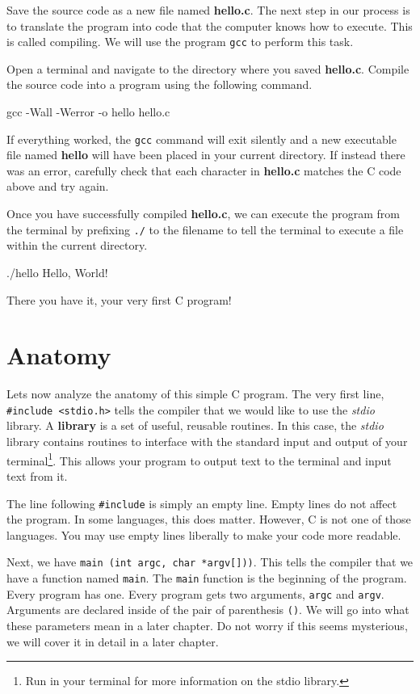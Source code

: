 \documentclass[12pt]{article}
\newcommand{\file}[1]{{\bf\ttfamily #1}}
\newcommand{\ident}[1]{{\it\ttfamily #1}}
\begin{document}
Save the source code as a new file named \file{hello.c}. The next step in our
process is to translate the program into code that the computer knows how to
execute. This is called compiling. We will use the program \verb|gcc| to
perform this task.

Open a terminal and navigate to the directory where you saved \file{hello.c}.
Compile the source code into a program using the following command.

\begin{Terminal}
gcc -Wall -Werror -o hello hello.c
\end{Terminal}

If everything worked, the \verb|gcc| command will exit silently and a new
executable file named \file{hello} will have been placed in your current
directory. If instead there was an error, carefully check that each character in
\file{hello.c} matches the C code above and try again.

Once you have successfully compiled \file{hello.c}, we can execute the program
from the terminal by prefixing \verb|./| to the filename to tell the terminal
to execute a file within the current directory.

\begin{Terminal}
./hello
Hello, World!
\end{Terminal}

There you have it, your very first C program!

\section{Anatomy}

Lets now analyze the anatomy of this simple C program. The very first line,
\verb|#include <stdio.h>| tells the compiler that we would like to use the
\ident{stdio} library. A \textbf{library} is a set of useful, reusable
routines. In this case, the \ident{stdio} library contains routines to
interface with the standard input and output of your terminal\footnote{Run
 \rmfamily in your terminal for more information on the
stdio library.}.  This allows your program to output text to the terminal and
input text from it.

The line following \verb|#include| is simply an empty line. Empty lines do
not affect the program. In some languages, this does matter. However, C is not
one of those languages. You may use empty lines liberally to make your code
more readable.

Next, we have \verb|main (int argc, char *argv[]))|. This tells the compiler
that we have a function named \verb|main|. The \verb|main| function is the
beginning of the program.  Every program has one. Every program gets two
arguments, \verb|argc| and \verb|argv|. Arguments are declared inside of the
pair of parenthesis \verb|()|. We will go into what these parameters mean in a
later chapter. Do not worry if this seems mysterious, we will cover it in detail
in a later chapter.
\end{document}
